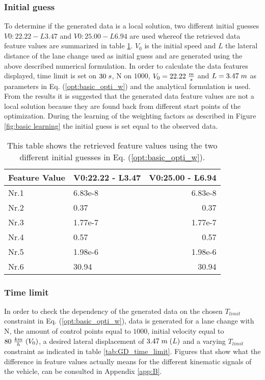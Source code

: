\subsubsection{Initial guess}
To determine if the generated data is a local solution, two different initial guesses $V0:22.22 - L3.47$ and $V0:25.00 - L6.94$ are used whereof the retrieved data feature values are summarized in table \ref{tab:GD_local_test}. $V_0$ is the initial speed and $L$ the lateral distance of the lane change used as initial guess and are generated using the above described numerical formulation. In order to calculate the data features displayed, time limit is set on $30\hspace{1mm}s$, N on $1000$, $V_{0} = 22.22\hspace{1mm}\frac{m}{s}$ and $L = 3.47\hspace{1mm}m$ as parameters in Eq. (\ref{opt:basic_opti_w}) and the analytical formulation is used. From the results it is suggested that the generated data feature values are not a local solution because they are found back from different start points of the optimization. During the learning of the weighting factors as described in Figure \ref{fig:basic learning} the initial guess is set equal to the observed data. 

\begin{table}[h!]
	\centering
	\begin{tabular}{@{}llr@{}} \toprule
		\textbf{Feature Value}     & V0:22.22 - L3.47 & V0:25.00 - L6.94\\ \midrule
		Nr.1       & 6.83e-8   & 6.83e-8 \\
		Nr.2       & 0.37        & 0.37  \\
		Nr.3       & 1.77e-7     & 1.77e-7 \\
		Nr.4       & 0.57    & 0.57  \\
		Nr.5       & 1.98e-6     & 1.98e-6 \\
		Nr.6       & 30.94      & 30.94\\ \bottomrule
	\end{tabular}
	\caption{This table shows the retrieved feature values using the two different  initial guesses in Eq. (\ref{opt:basic_opti_w}).}
	\label{tab:GD_local_test}
\end{table}

\subsubsection{Time limit}
In order to check the dependency of the generated data on the chosen $T_{limit}$ constraint in Eq. (\ref{opt:basic_opti_w}), data is generated for a lane change with N, the amount of control points equal to $1000$, initial velocity equal to $80 \hspace{1 mm} \frac{km}{h}\hspace{1mm}(V_{0})$, a desired lateral displacement of $3.47\hspace{1mm}m\hspace{1mm}(L)$ and a varying $T_{limit}$ constraint as indicated in table \ref{tab:GD_time_limit}. Figures that  show what the difference in feature values actually means for the different kinematic signals of the vehicle, can be consulted in Appendix \ref{app:B}.

